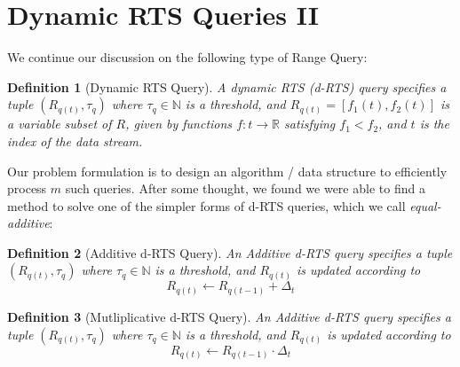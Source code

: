 \documentclass{article}
\newtheorem{definition}{Definition}
\begin{document}
\hspace{95mm}

\section*{Dynamic RTS Queries II}

We continue our discussion on the following type of Range Query: 

\begin{definition}[Dynamic RTS Query] A dynamic RTS (\textit{d-RTS}) query specifies a tuple $(R_{q(t)}, \tau_q)$ where $\tau_q \in \mathbb{N}$
    is a threshold, and $R_{q(t)} =[f_1(t), f_2(t)]$ is a variable subset of $R$, given by functions $f: t\rightarrow\mathbb{R}$ satisfying $f_1 < f_2$, and $t$ is the index of the data stream.
\end{definition}

Our problem formulation is to design an algorithm / data structure to efficiently process $m$ such queries. After some thought, we found we were able to find a method to solve one of the simpler forms of d-RTS queries, which we call \textit{equal-additive}:

\begin{definition}[Additive d-RTS Query]
    An Additive d-RTS query specifies a tuple $(R_{q(t)}, \tau_q)$ where $\tau_q\in \mathbb{N}$ is a threshold, and $R_{q(t)}$ is updated according to
    $$R_{q(t)} \leftarrow R_{q(t-1)} + \Delta_t$$
\end{definition}


\begin{definition}[Mutliplicative d-RTS Query]
    An Additive d-RTS query specifies a tuple $(R_{q(t)}, \tau_q)$ where $\tau_q\in \mathbb{N}$ is a threshold, and $R_{q(t)}$ is updated according to
    $$R_{q(t)} \leftarrow R_{q(t-1)} \cdot \Delta_t$$
\end{definition}
\end{document}
